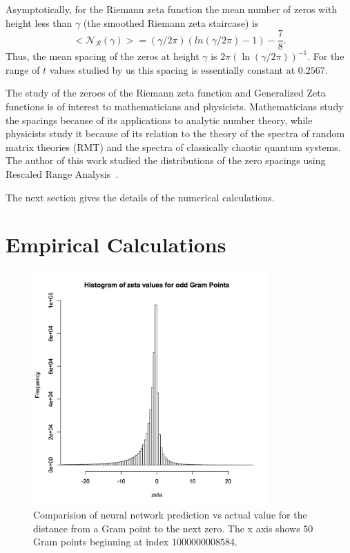 \documentclass[twoside]{article}
\begin{document}
Asymptotically, for the Riemann zeta function the mean number of 
zeros with height less than $\gamma$ (the smoothed Riemann zeta staircase)
is~\cite{Edwards(1974)}
\begin{equation}  
<\mathcal{N_R} (\gamma)> = (\gamma/2\pi)(ln(\gamma/2\pi)-1)-\frac{7}{8}.
\label{eq:Rnumber}
\end{equation}
Thus, the mean spacing of the zeros at height $\gamma$ is 
$2\pi(\ln (\gamma/2\pi))^{-1}$. For the range of $t$ values
studied by us this spacing is essentially constant at $0.2567$.

The study of the zeroes of the Riemann zeta function and Generalized 
Zeta functions is of interest to mathematicians and physicists. Mathematicians 
study the spacings because of its applications to analytic number theory, 
while physicists study it because of its  relation 
to the theory of the spectra of random matrix theories (RMT) 
and the spectra of classically chaotic quantum systems. 
The author of this work studied the distributions of the zero 
spacings using Rescaled Range Analysis~\cite{os6}.


The next section gives the details of the numerical calculations.

\section{\label{sec3}Empirical Calculations}


\begin{figure}
\centering
\includegraphics[width=0.8\textwidth]{ozeta.jpg}
\caption[]{ 
 Comparision of neural network prediction vs actual value
 for the distance from a Gram point to the next zero.
 The x axis shows $50$ Gram points beginning at index $1000000008584$.
 }
\label{NextZero}
\end{figure}
\end{document}

